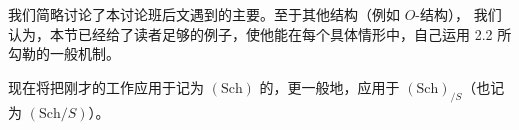我们简略讨论了本讨论班后文遇到的主要。至于其他结构（例如 $O$-结构），
我们认为，本节已经给了读者足够的例子，使他能在每个具体情形中，自己运用 2.2 所勾勒的一般机制。

现在将把刚才的工作应用于记为 $(\mathrm{Sch})$ 的，更一般地，应用于 $(\mathrm{Sch})_{/S}$（也记为 $(\mathrm{Sch}/S)$）。
